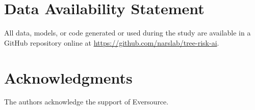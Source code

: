 \documentclass[Journal,letterpaper, SingleSpace, InsideFigs]{ascelike-new}
\begin{document}
\section{Data Availability Statement}
All data, models, or code generated or used during the study are available in a GitHub repository online at \url{https://github.com/narslab/tree-risk-ai}.

\section{Acknowledgments}
The authors acknowledge the support of Eversource.

\appendix

\eject
   
\end{document}
